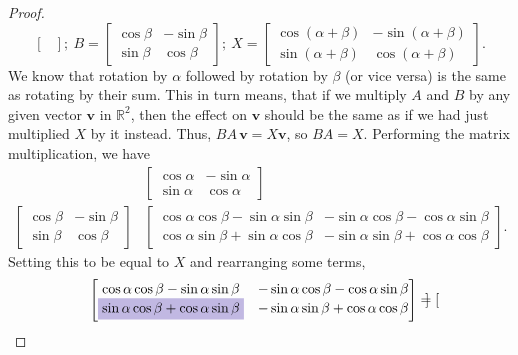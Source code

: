 \documentclass{article}
\begin{document}
\begin{enumerate}
\begin{enumerate}
\begin{proof}
\[\begin{bmatrix}
                \end{bmatrix};~B = \begin{bmatrix}
                    \cos\beta&-\sin\beta \\ \sin\beta&\cos\beta
                \end{bmatrix};~X =  \begin{bmatrix}
                    \cos(\alpha + \beta)&-\sin(\alpha + \beta) \\ \sin(\alpha+\beta)&\cos(\alpha + \beta)
                \end{bmatrix}.
            \] We know that rotation by \(\alpha\) followed by rotation by \(\beta\) (or vice versa) is the same as rotating by their sum. This in turn means, that if we multiply \(A\) and \(B\) by any given vector \(\mathbf{v}\) in \(\mathbb{R}^2\), then the effect on \(\mathbf{v}\)
            should be the same as if we had just multiplied \(X\) by it instead. Thus, \(BA\,\mathbf{v} = X\mathbf{v}\), so \(BA = X\). Performing the matrix multiplication, we have\begin{align*}
                &\begin{bmatrix}
                    \cos\alpha&-\sin\alpha \\ \sin\alpha&\cos\alpha
                \end{bmatrix} \\
                \begin{bmatrix}
                    \cos\beta&-\sin\beta \\ \sin\beta&\cos\beta
                \end{bmatrix} & \begin{bmatrix}
                    \cos\alpha\cos\beta - \sin\alpha\sin\beta&-\sin\alpha\cos\beta-\cos\alpha\sin\beta \\ 
                    \cos\alpha\sin\beta + \sin\alpha\cos\beta& -\sin\alpha\sin\beta + \cos\alpha\cos\beta
                \end{bmatrix}.
            \end{align*} Setting this to be equal to \(X\) and rearranging some terms,\[
                \begin{bmatrix}
                    \cos\alpha\cos\beta - \sin\alpha\sin\beta&-\sin\alpha\cos\beta-\cos\alpha\sin\beta \\ 
                    \colorbox{Periwinkle!42}{\(\sin\alpha\cos\beta + \cos\alpha\sin\beta\)}& -\sin\alpha\sin\beta + \cos\alpha\cos\beta
                \end{bmatrix} = \begin{bmatrix}

\end{bmatrix}\]
\end{proof}
\end{enumerate}
\end{enumerate}
\end{document}
